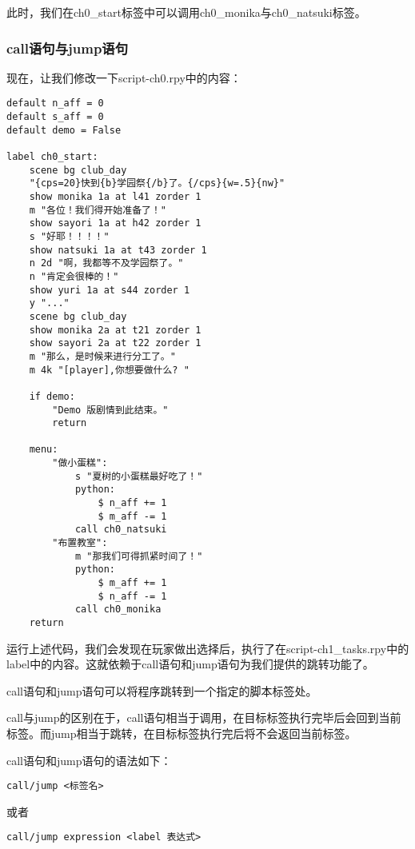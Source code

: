 此时，我们在ch0\_start标签中可以调用ch0\_monika与ch0\_natsuki标签。

\subsubsection{call语句与jump语句}

现在，让我们修改一下script-ch0.rpy中的内容：
\begin{lstlisting}[caption=script-ch0.rpy]
default n_aff = 0
default s_aff = 0
default demo = False

label ch0_start:
    scene bg club_day
    "{cps=20}快到{b}学园祭{/b}了。{/cps}{w=.5}{nw}"
    show monika 1a at l41 zorder 1
    m "各位！我们得开始准备了！"
    show sayori 1a at h42 zorder 1
    s "好耶！！！！"
    show natsuki 1a at t43 zorder 1
    n 2d "啊，我都等不及学园祭了。"
    n "肯定会很棒的！"
    show yuri 1a at s44 zorder 1
    y "..."
    scene bg club_day
    show monika 2a at t21 zorder 1
    show sayori 2a at t22 zorder 1
    m "那么，是时候来进行分工了。"
    m 4k "[player],你想要做什么? "

    if demo:
        "Demo 版剧情到此结束。"
        return

    menu:
        "做小蛋糕":
            s "夏树的小蛋糕最好吃了！"
            python:
                $ n_aff += 1
                $ m_aff -= 1
            call ch0_natsuki
        "布置教室":
            m "那我们可得抓紧时间了！"
            python:
                $ m_aff += 1
                $ n_aff -= 1
            call ch0_monika
    return
\end{lstlisting}

运行上述代码，我们会发现在玩家做出选择后，执行了在script-ch1\_tasks.rpy中的label中的内容。这就依赖于call语句和jump语句为我们提供的跳转功能了。

call语句和jump语句可以将程序跳转到一个指定的脚本标签处。

call与jump的区别在于，call语句相当于调用，在目标标签执行完毕后会回到当前标签。而jump相当于跳转，在目标标签执行完后将不会返回当前标签。

call语句和jump语句的语法如下：
\begin{lstlisting}
call/jump <标签名>
\end{lstlisting}

或者

\begin{lstlisting}
call/jump expression <label 表达式>
\end{lstlisting}

